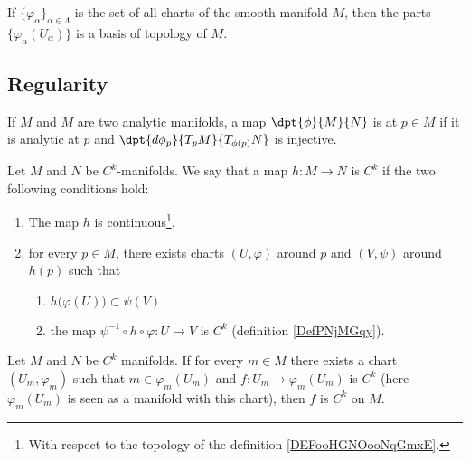 \begin{proposition}		\label{PROPooCXXKooJAOmOl}
	If \( \{ \varphi_{\alpha} \}_{\alpha\in \Lambda}\) is the set of all charts of the smooth manifold \( M\), then the parts \( \{ \varphi_{\alpha}(U_{\alpha}) \}\) is a basis of topology of \( M\).
\end{proposition}



\subsection{Regularity}

\begin{definition}      \label{DEFooMELXooEkEnwz}
	If $M$ and $M$ are two analytic manifolds, a map $\dpt{\phi}{M}{N}$ is \label{PgDefRegular} at $p\in M$ if it is analytic at $p$ and $\dpt{d\phi_p}{T_pM}{T_{\phi(p)}N}$ is injective.
\end{definition}

\begin{definition}        \label{DEFooFNTHooEwsqXB}
	Let \( M\) and \( N\) be \( C^k\)-manifolds. We say that a map \( h\colon M\to N\) is \( C^k\) if the two following conditions hold:
	\begin{enumerate}
		\item
		      The map \( h\) is continuous\footnote{With respect to the topology of the definition \ref{DEFooHGNOooNqGmxE}.}.
		\item
		      for every \( p\in M\), there exists charts \( (U,\varphi)\) around \( p\) and \( (V,\psi)\) around \( h(p)\) such that
		      \begin{enumerate}
			      \item
			            \( h\big( \varphi(U) \big)\subset\psi(V)\)
			      \item       \label{SUBITEMooXQFUooRxMVnw}
			            the map \( \psi^{-1}\circ h\circ\varphi\colon U \to V \) is \( C^k\) (definition \ref{DefPNjMGqy}).
		      \end{enumerate}
	\end{enumerate}
\end{definition}

\begin{proposition}		\label{PROPooGQVUooWmPmQV}
	Let \( M\) and \( N\) be \( C^k\) manifolds. If for every \( m\in M\) there exists a chart \( (U_m,\varphi_m)\) such that \( m\in \varphi_m(U_m)\) and  \(f \colon U_m\to \varphi_m(U_m)  \) is \( C^k\) (here \( \varphi_m(U_m)\) is seen as a manifold with this chart), then \( f\) is \( C^k\) on \( M\).
\end{proposition}

